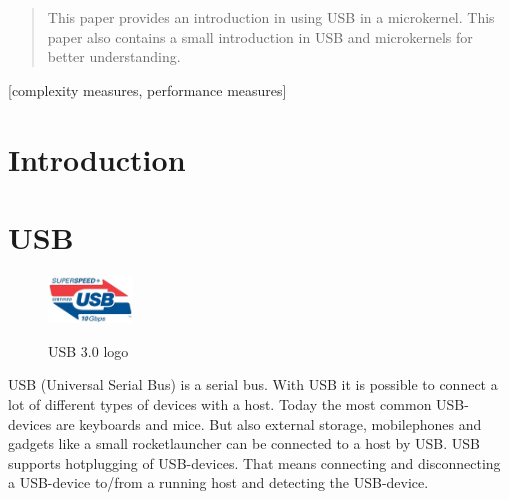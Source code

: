 \documentclass{acm_proc_article-sp}
\begin{document}
\maketitle
\begin{abstract}
This paper provides an introduction in using USB in a microkernel.
This paper also contains a small introduction in USB and microkernels for better understanding.


\end{abstract}

[complexity measures, performance measures]



\section{Introduction}
\section{USB}
\begin{figure}
\centering
\includegraphics[width=0.2\textwidth]{usblogo.jpg}
\label{fig:usblogo}
\caption{USB 3.0 logo}
\end{figure}
USB (Universal Serial Bus) is a serial bus.
With USB it is possible to connect a lot of different types of devices with a host.
Today the most common USB-devices are keyboards and mice. But also external storage, mobilephones and gadgets like a small rocketlauncher can be connected to a host by USB. USB supports hotplugging of USB-devices. That means connecting and disconnecting a USB-device to/from a running host and detecting the USB-device.
\end{document}
